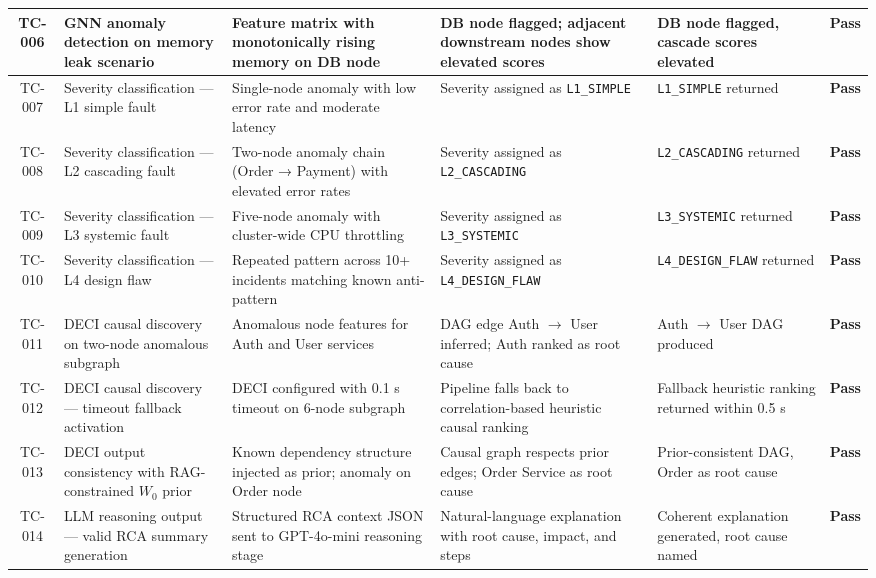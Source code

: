 \begin{center}
\begin{longtable}{|c|>{\RaggedRight\arraybackslash}p{3.2cm}|>{\RaggedRight\arraybackslash}p{3.5cm}|>{\RaggedRight\arraybackslash}p{3.5cm}|>{\RaggedRight\arraybackslash}p{2.2cm}|c|}
TC-006 & GNN anomaly detection on memory leak scenario & Feature matrix with monotonically rising memory on DB node & DB node flagged; adjacent downstream nodes show elevated scores & DB node flagged, cascade scores elevated & \textbf{Pass} \\
\hline

TC-007 & Severity classification — L1 simple fault & Single-node anomaly with low error rate and moderate latency & Severity assigned as \texttt{L1\_SIMPLE} & \texttt{L1\_SIMPLE} returned & \textbf{Pass} \\
\hline

TC-008 & Severity classification — L2 cascading fault & Two-node anomaly chain (Order → Payment) with elevated error rates & Severity assigned as \texttt{L2\_CASCADING} & \texttt{L2\_CASCADING} returned & \textbf{Pass} \\
\hline

TC-009 & Severity classification — L3 systemic fault & Five-node anomaly with cluster-wide CPU throttling & Severity assigned as \texttt{L3\_SYSTEMIC} & \texttt{L3\_SYSTEMIC} returned & \textbf{Pass} \\
\hline

TC-010 & Severity classification — L4 design flaw & Repeated pattern across 10+ incidents matching known anti-pattern & Severity assigned as \texttt{L4\_DESIGN\_FLAW} & \texttt{L4\_DESIGN\_FLAW} returned & \textbf{Pass} \\
\hline

TC-011 & DECI causal discovery on two-node anomalous subgraph & Anomalous node features for Auth and User services & DAG edge Auth $\rightarrow$ User inferred; Auth ranked as root cause & Auth $\rightarrow$ User DAG produced & \textbf{Pass} \\
\hline

TC-012 & DECI causal discovery — timeout fallback activation & DECI configured with 0.1 s timeout on 6-node subgraph & Pipeline falls back to correlation-based heuristic causal ranking & Fallback heuristic ranking returned within 0.5 s & \textbf{Pass} \\
\hline

TC-013 & DECI output consistency with RAG-constrained $W_0$ prior & Known dependency structure injected as prior; anomaly on Order node & Causal graph respects prior edges; Order Service as root cause & Prior-consistent DAG, Order as root cause & \textbf{Pass} \\
\hline

TC-014 & LLM reasoning output — valid RCA summary generation & Structured RCA context JSON sent to GPT-4o-mini reasoning stage & Natural-language explanation with root cause, impact, and steps & Coherent explanation generated, root cause named & \textbf{Pass} \\
\hline


\end{longtable}
\end{center}
